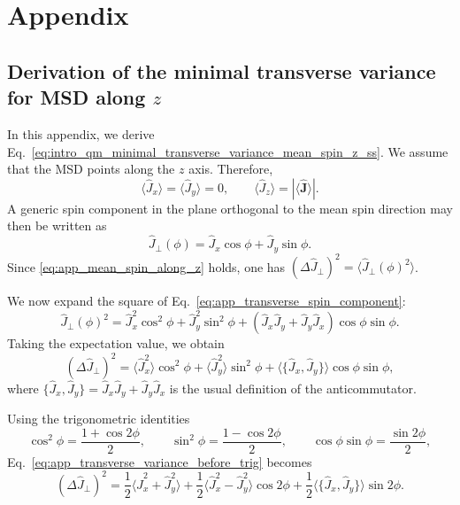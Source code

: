 \chapter*{Appendix}
\label{chapter:appendix}

\section*{Derivation of the minimal transverse variance for MSD along \(z\)}
\label{app:derivation_minimal_transverse_variance_mean_spin_z}

In this appendix, we derive Eq.~\eqref{eq:intro_qm_minimal_transverse_variance_mean_spin_z_ss}. We assume that the MSD points along the \(z\) axis. Therefore,
\begin{equation}
	\langle \hat J_x \rangle = \langle \hat J_y \rangle = 0,
	\qquad
	\langle \hat J_z \rangle = |\langle \hat{\mathbf{J}}\rangle|.
	\label{eq:app_mean_spin_along_z}
\end{equation}
A generic spin component in the plane orthogonal to the mean spin direction may then be written as
\begin{equation}
	\hat J_\perp(\phi)=\hat J_x \cos\phi + \hat J_y \sin\phi.
	\label{eq:app_transverse_spin_component}
\end{equation}
Since \eqref{eq:app_mean_spin_along_z} holds, one has 	$(\Delta \hat J_\perp)^2 = \langle \hat J_\perp(\phi)^2\rangle$.

We now expand the square of Eq.~\eqref{eq:app_transverse_spin_component}:
\begin{equation}
	\hat J_\perp(\phi)^2
	=
	\hat J_x^2 \cos^2\phi
	+
	\hat J_y^2 \sin^2\phi
	+
	\left( \hat J_x \hat J_y + \hat J_y \hat J_x \right)\cos\phi \sin\phi.
	\label{eq:app_square_transverse_spin_component}
\end{equation}
Taking the expectation value, we obtain
\begin{equation}
	(\Delta \hat J_\perp)^2
	=
	\langle \hat J_x^2\rangle \cos^2\phi
	+
	\langle \hat J_y^2\rangle \sin^2\phi
	+
	\langle \{\hat J_x,\hat J_y\} \rangle \cos\phi \sin\phi,
	\label{eq:app_transverse_variance_before_trig}
\end{equation}
where $\{\hat J_x,\hat J_y\} = \hat J_x \hat J_y + \hat J_y \hat J_x$ is the usual definition of the anticommutator.

Using the trigonometric identities
\begin{equation}
	\cos^2\phi = \frac{1+\cos 2\phi}{2},
	\qquad
	\sin^2\phi = \frac{1-\cos 2\phi}{2},
	\qquad
	\cos\phi \sin\phi = \frac{\sin 2\phi}{2},
	\label{eq:app_trigonometric_identities}
\end{equation}
Eq.~\eqref{eq:app_transverse_variance_before_trig} becomes
\begin{equation}
	(\Delta \hat J_\perp)^2
	=
	\frac{1}{2}\langle \hat J_x^2+\hat J_y^2\rangle
	+
	\frac{1}{2}\langle \hat J_x^2-\hat J_y^2\rangle \cos 2\phi
	+
	\frac{1}{2}\langle \{\hat J_x,\hat J_y\}\rangle \sin 2\phi.
	\label{eq:app_transverse_variance_after_trig}
\end{equation}

